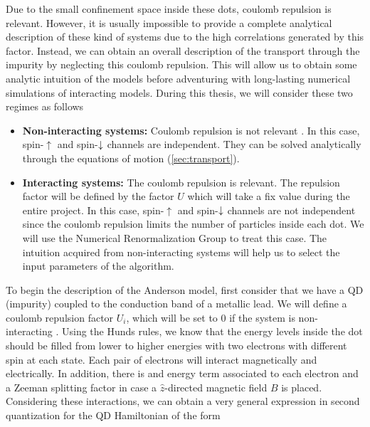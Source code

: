  Due to the small confinement space inside these dots,  coulomb repulsion is relevant. However, it is usually impossible to provide a complete analytical description of these kind of systems due to the high correlations generated by this factor. Instead, we can obtain an overall description of the transport through the impurity by neglecting this coulomb repulsion. This will allow us to obtain some analytic intuition of the models  before adventuring with long-lasting numerical simulations of interacting models. During this thesis, we will consider these two regimes as follows
\begin{itemize}
    \item \textbf{Non-interacting systems:} Coulomb repulsion is not relevant . In this case, spin-$\uparrow$ and spin-$\downarrow$ channels are independent. They can be solved analytically through the equations of motion (\ref{sec:transport}). 

    \item \textbf{Interacting systems:} The coulomb repulsion is relevant. The repulsion factor will be defined by the factor $U$ which will take a fix value during the entire project. In this case, spin-$\uparrow$ and spin-$\downarrow$ channels are not independent since the coulomb repulsion limits the number of particles inside each dot. We will use the Numerical Renormalization Group to treat this case. The intuition acquired from non-interacting systems will help us to select the input parameters of the algorithm.  
\end{itemize}



To begin the description of the Anderson model, first consider that we have a QD (impurity) coupled to the conduction band of a metallic lead. We will define a coulomb repulsion factor $U_i$, which will be set to $0$ if the system is non-interacting . Using the Hunds rules, we know that the energy levels inside the dot should be filled from lower to higher energies with two electrons with different spin at each state. Each pair of electrons will interact magnetically and electrically. In addition, there is and energy term associated to each electron and a Zeeman splitting factor in case a $\hat{z}$-directed magnetic field $B$ is placed.  Considering these interactions, we can obtain a very general expression in second quantization for the QD Hamiltonian
of the form \citep[(3.2)]{sindel_numerical_2005}

